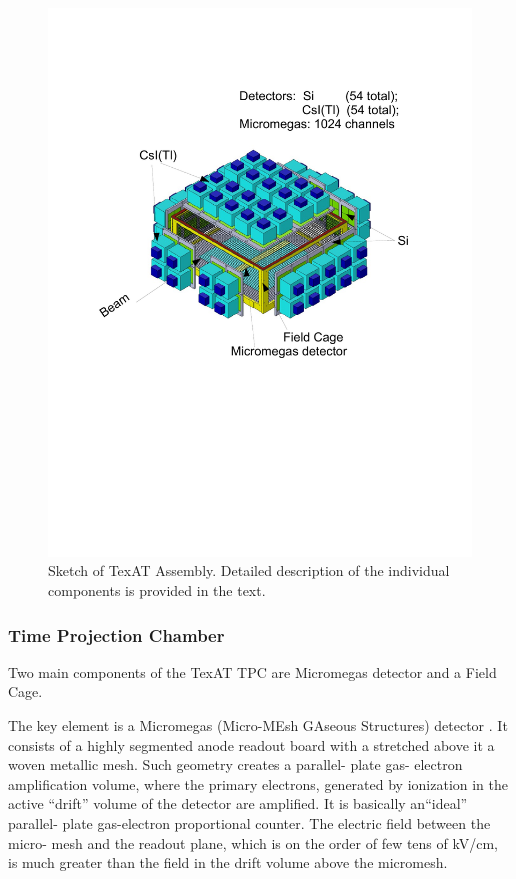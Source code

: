\documentclass[final,number,sort&compress,5p,times,twocolumn]{elsarticle}
\begin{document}
\begin{figure}[htb!]
\centering
  \includegraphics[width=1.0\columnwidth]{figs/TexAT_Assembly}
    \caption{Sketch of TexAT Assembly. Detailed description of the individual components is provided in the text.} 
   \label{fig:TexAT_Assembly}
\end{figure}

\subsubsection{Time Projection Chamber}
	
Two main components of the TexAT TPC are Micromegas detector and a Field Cage.
		
The key element  is a Micromegas (Micro-MEsh GAseous Structures) detector \cite{Micromegas_1, Micromegas_2}. It consists  of a highly segmented anode readout board with a stretched above it a woven metallic mesh. Such geometry creates a  parallel- plate gas- electron amplification volume, where the  primary electrons, generated by ionization in the active ``drift'' volume of the detector are amplified. It is basically an``ideal'' parallel- plate gas-electron proportional counter.  The electric field between the micro- mesh and the readout plane, which is on the order of few tens of kV/cm, is much greater than the field in the drift volume above the micromesh.
\end{document}

